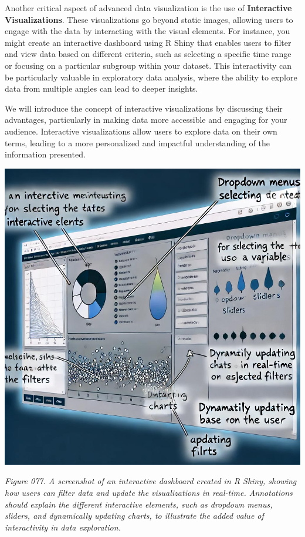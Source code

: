 \documentclass[
]{book}
\begin{document}
Another critical aspect of advanced data visualization is the use of \textbf{Interactive Visualizations}. These visualizations go beyond static images, allowing users to engage with the data by interacting with the visual elements. For instance, you might create an interactive dashboard using R Shiny that enables users to filter and view data based on different criteria, such as selecting a specific time range or focusing on a particular subgroup within your dataset. This interactivity can be particularly valuable in exploratory data analysis, where the ability to explore data from multiple angles can lead to deeper insights.

We will introduce the concept of interactive visualizations by discussing their advantages, particularly in making data more accessible and engaging for your audience. Interactive visualizations allow users to explore data on their own terms, leading to a more personalized and impactful understanding of the information presented.

\includegraphics[width=1\textwidth,height=\textheight]{images/fig077.jpg}

\emph{Figure 077. A screenshot of an interactive dashboard created in R Shiny, showing how users can filter data and update the visualizations in real-time. Annotations should explain the different interactive elements, such as dropdown menus, sliders, and dynamically updating charts, to illustrate the added value of interactivity in data exploration.}
\end{document}
